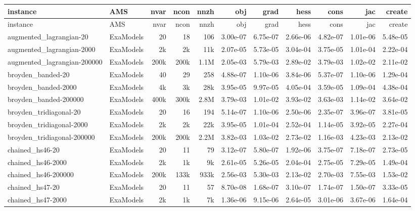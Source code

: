 {\scriptsize
\setlength{\tabcolsep}{4pt}
\begin{longtable}{@{}ll rrr rrr rr r@{}}
  \toprule
  instance & AMS & nvar & ncon & nnzh & obj & grad & hess & cons & jac & create \\
  \midrule
  \endfirsthead
  \toprule
  instance & AMS & nvar & ncon & nnzh & obj & grad & hess & cons & jac & create \\
  \midrule
  \endhead
  augmented\_lagrangian-20 & ExaModels & 20 & 18 & 106 & 3.00e-07 & 6.75e-07 & 2.66e-06 & 4.82e-07 & 1.01e-06 & 5.48e-05 \\
  augmented\_lagrangian-2000 & ExaModels & 2k & 2k & 11k & 2.07e-05 & 5.73e-05 & 3.04e-04 & 3.75e-05 & 1.01e-04 & 2.22e-04 \\
  augmented\_lagrangian-200000 & ExaModels & 200k & 200k & 1.1M & 2.05e-03 & 5.79e-03 & 2.89e-02 & 3.79e-03 & 1.02e-02 & 2.11e-02 \\
  broyden\_banded-20 & ExaModels & 40 & 29 & 258 & 4.88e-07 & 1.10e-06 & 3.84e-06 & 5.37e-07 & 1.10e-06 & 1.29e-04 \\
  broyden\_banded-2000 & ExaModels & 4k & 3k & 28k & 3.95e-05 & 9.97e-05 & 4.05e-04 & 3.59e-05 & 1.09e-04 & 4.38e-04 \\
  broyden\_banded-200000 & ExaModels & 400k & 300k & 2.8M & 3.79e-03 & 1.01e-02 & 3.93e-02 & 3.63e-03 & 1.14e-02 & 3.64e-02 \\
  broyden\_tridiagonal-20 & ExaModels & 20 & 16 & 194 & 5.14e-07 & 1.10e-06 & 2.50e-06 & 2.35e-07 & 3.96e-07 & 3.81e-05 \\
  broyden\_tridiagonal-2000 & ExaModels & 2k & 2k & 22k & 3.95e-05 & 1.01e-04 & 2.52e-04 & 1.14e-05 & 3.92e-05 & 2.27e-04 \\
  broyden\_tridiagonal-200000 & ExaModels & 200k & 200k & 2.2M & 3.82e-03 & 1.03e-02 & 2.73e-02 & 1.16e-03 & 4.23e-03 & 2.13e-02 \\
  chained\_hs46-20 & ExaModels & 20 & 11 & 79 & 3.12e-07 & 5.80e-07 & 1.92e-06 & 3.75e-07 & 7.18e-07 & 2.73e-05 \\
  chained\_hs46-2000 & ExaModels & 2k & 1k & 9k & 2.61e-05 & 5.26e-05 & 2.04e-04 & 2.75e-05 & 7.29e-05 & 1.49e-04 \\
  chained\_hs46-200000 & ExaModels & 200k & 133k & 933k & 2.56e-03 & 5.30e-03 & 2.13e-02 & 2.70e-03 & 7.55e-03 & 1.53e-02 \\
  chained\_hs47-20 & ExaModels & 20 & 11 & 57 & 8.70e-08 & 1.68e-07 & 3.10e-07 & 1.74e-07 & 1.50e-07 & 3.33e-05 \\
  chained\_hs47-2000 & ExaModels & 2k & 1k & 7k & 1.36e-06 & 9.15e-06 & 2.64e-05 & 3.01e-06 & 3.67e-06 & 1.64e-04 \\

\end{longtable}}
